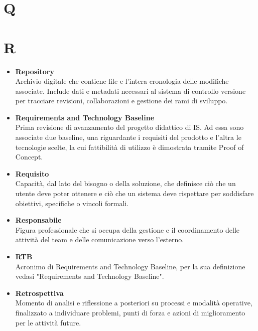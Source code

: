 \documentclass[a4paper,12pt]{article}
\begin{document}
        \section*{Q} {
            
        }
        \newpage

        \section*{R} {
            \begin{itemize}
                \item \textbf{Repository}\\
                    Archivio digitale che contiene file e l'intera cronologia delle modifiche associate. Include dati e metadati necessari al sistema di controllo versione per tracciare revisioni, collaborazioni e gestione dei rami di sviluppo.
                \item \textbf{Requirements and Technology Baseline}\\
                    Prima revisione di avanzamento del progetto didattico di IS. Ad essa sono associate due baseline, una riguardante i requisiti del prodotto e l'altra le tecnologie scelte, la cui fattibilità di utilizzo è dimostrata tramite Proof of Concept.
                \item \textbf{Requisito}\\
                    Capacità, dal lato del bisogno o della soluzione, che definisce ciò che un utente deve poter ottenere e ciò che un sistema deve rispettare per soddisfare obiettivi, specifiche o vincoli formali.
                \item \textbf{Responsabile}\\
                    Figura professionale che si occupa della gestione e il coordinamento delle attività del team e delle comunicazione verso l'esterno.
                \item \textbf{RTB}\\
                    Acronimo di Requirements and Technology Baseline, per la sua definizione vedasi "Requirements and Technology Baseline".
                \item \textbf{Retrospettiva}\\
                    Momento di analisi e riflessione a posteriori su processi e modalità operative, finalizzato a individuare problemi, punti di forza e azioni di miglioramento per le attività future.
            \end{itemize}
        }
        \newpage
\end{document}
